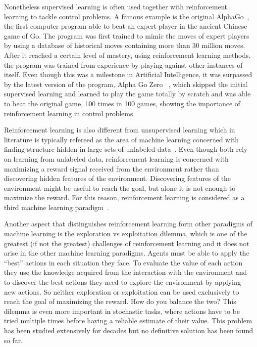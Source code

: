 Nonetheless supervised learning is often used together with reinforcement learning to tackle control problems. A famous example is the original AlphaGo~\cite{Silver_2016}, the first computer program able to beat an expert player in the ancient Chinese game of Go. The program was first trained to mimic the moves of expert players by using a database of historical moves containing more than 30 million moves. After it reached a certain level of mastery, using reinforcement learning methods,  the program was trained from experience by playing against other instances of itself. Even though this was a milestone in Artificial Intelligence, it was surpassed by the latest version of the program, Alpha Go Zero~\cite{silver2017mastering} , which skipped the initial supervised learning and learned to play the game totally by scratch and was able to beat the original game, 100 times in 100 games, showing the importance of reinforcement learning in control problems.\par
Reinforcement learning is also different from unsupervised learning which in literature is typically refereed as the area of machine learning concerned with finding structure hidden in large sets of unlabeled data~\cite{hastie_09_elements-of.statistical-learning}. Even though both rely on learning from unlabeled data, reinforcement learning is concerned with maximizing a reward signal received from the environment rather than discovering hidden features of the environment. Discovering features of the environment might be useful to reach the goal, but alone it is not enough to maximize the reward. For this reason, reinforcement learning is considered as a third machine learning paradigm~\cite{Sutton:1998:IRL:551283}.\par
Another aspect that distinguishes reinforcement learning form other paradigms of machine learning is the exploration vs exploitation dilemma, which is one of the greatest (if not the greatest) challenges of reinforcement learning and it does not arise in the other machine learning paradigms. Agents must be able  to apply the “best” actions in each situation  they face. To evaluate the value of each action they use the knowledge acquired from the interaction with the environment and to discover the best actions they need to explore the environment by applying new actions. So neither exploration or exploitation can be used exclusively to reach the goal of maximizing the reward. How do you balance the two? This dilemma is even more important in stochastic tasks, where actions have to be tried multiple times before having a reliable estimate of their value. This problem has been studied extensively for decades but no definitive solution has been found so far.\par
